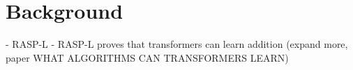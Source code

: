 \chapter{Background}\label{background}


- RASP-L
- RASP-L proves that transformers can learn addition (expand more, paper WHAT ALGORITHMS CAN TRANSFORMERS LEARN)